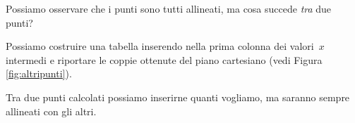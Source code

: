 Possiamo osservare che i punti sono tutti allineati, ma cosa succede 
\emph{tra} due punti? 
% 
% 
% 

Possiamo costruire una tabella inserendo nella prima colonna dei valori~\(x\) 
intermedi e riportare le coppie ottenute del piano cartesiano (vedi Figura 
\ref{fig:altripunti}).

Tra due punti calcolati possiamo inserirne quanti vogliamo, ma saranno sempre 
allineati con gli altri.

